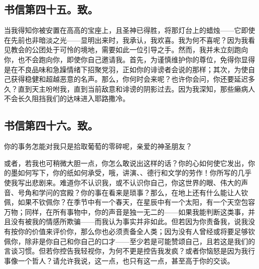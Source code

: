 
\subsection{书信第四十五。致。}

\par

当我得知你被安置在高高的宝座上，且圣神已得胜，将那灯台上的蜡烛——它即使在先前也非暗淡之光——显明出来时，我承认，我欢喜。我为何不喜呢？因为我看见教会的公团处于可怜的境地，需要如此一位引导之手。然而，我并未立刻跑向你，也不会跑向你，即使你自己邀请我。首先，为谨慎维护你的尊位，免得你显得是在不良品味和急躁情绪下招聚党羽，正如你的诽谤者会说的那样；其次，为使自己获得稳健和超越恶意的名声。那么，你何时会来呢？也许你会问，你还要延迟多久？直到天主吩咐我，直到当前敌意和诽谤的阴影过去。因为我深知，那些癞病人不会长久阻挡我们的达味进入耶路撒冷。\par


\subsection{书信第四十六。致。}

\par

你的事务怎能对我只是拾取葡萄的零碎呢，亲爱的神圣朋友？\par

或者，若我也可稍微大胆一点，你怎么敢说出这样的话？你的心如何使它发出，你的墨如何写下，你的纸如何承受，哦，讲演、、德行和文学的劳作！你所写的几乎使我写出悲剧来。难道你不认识我，或不认识你自己，你这世界的眼、伟大的声音、号角和学问的宫殿？你的事在看来是琐事？那么，在地上还有什么能让人钦佩，如果不钦佩你？在季节中有一个春天，在星辰中有一个太阳，有一个天空包容万物；同样，在所有事物中，你的声音是独一无二的——如果我能判断这类事，并且没有被我的情感所欺骗——而我认为事实并非如此。但若因为你责备我，说我没有按你的价值来评价你，那么你也必须责备全人类；因为没有人曾经或将要足够钦佩你，除非是你自己和你自己的口才——至少若是可能赞颂自己，且若这是我们的言谈习惯。但若你控告我轻视你，为何不更是控告我发疯？或者你恼怒是因为我行事像一个哲人？请允许我说，这一点，也只有这一点，甚至高于你的交谈。\par

